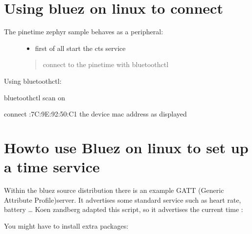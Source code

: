 \documentclass[letterpaper,10pt,english]{sphinxmanual}
\begin{document}
\section{Using bluez on linux to connect}
\label{\detokenize{current-time:using-bluez-on-linux-to-connect}}\begin{description}
\item[{The pinetime zephyr sample behaves as a peripheral:}] \leavevmode\begin{itemize}
\item {} 
first of all start the cts service

\end{itemize}
\begin{quote}

\sphinxhyphen{}connect to the pinetime with bluetoothctl
\end{quote}

\end{description}

Using bluetoothctl:

\begin{sphinxVerbatim}[commandchars=\\\{\}]
bluetoothctl
scan on


connect :7C:9E:92:50:C1 the device mac address as displayed
\end{sphinxVerbatim}


\section{Howto use Bluez on linux to set up a time service}
\label{\detokenize{current-time:howto-use-bluez-on-linux-to-set-up-a-time-service}}
Within the bluez source distribution there is an example GATT (Generic Attribute Profile)server. It advertises some standard service such as heart rate, battery …
Koen zandberg adapted this script, so it advertises the current time :

You might have to install extra packages:

\begin{sphinxVerbatim}[commandchars=\\\{\}]
\end{sphinxVerbatim}
\end{document}
